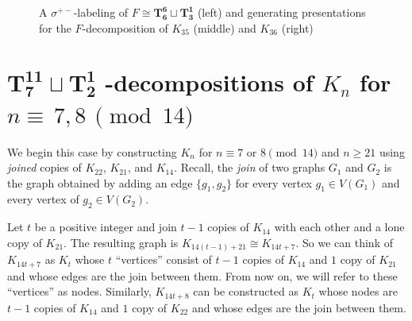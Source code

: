 \documentclass{dmgt}
\begin{document}
\begin{figure}[H]
    \caption{A $\sigma^{+-}$-labeling of $F \cong\mathbf{T_{6}^{6}} \sqcup \mathbf{T_{3}^{1}}$ (left) and generating presentations for the $F$-decomposition of $K_{35}$ (middle) and $K_{36}$ (right)}
    \label{tab:(1-2-3)example}
\end{figure}
\newpage
\section{$\mathbf{T_{7}^{11}}\sqcup\mathbf{T_{2}^{1}}$ -decompositions of $K_{n}$ for $n\equiv\,7,8\,\pmod{14}$} \label{sec:star}

We begin this case by constructing $K_{n}$ for $n \equiv 7 \textrm{ or } 8 \pmod{14}$ and $n\geq 21$ using \textit{joined} copies of $K_{22}$, $K_{21}$, and $K_{14}$. Recall, the \textit{join} of two graphs $G_{1}$ and $G_{2}$ is the graph obtained by adding an edge $\{g_1,g_2\}$ for every vertex $g_1 \in V(G_{1})$ and every vertex of $g_2 \in V(G_{2})$.

Let $t$ be a positive integer and join $t-1$ copies of $K_{14}$ with each other and a lone copy of $K_{21}$. The resulting graph is $K_{14(t-1)+21} \cong K_{14t+7}$. So we can think of $K_{14t+7}$ as $K_{t}$ whose $t$ ``vertices'' consist of $t-1$ copies of $K_{14}$ and $1$ copy of $K_{21}$ and whose edges are the join between them. From now on, we will refer to these ``vertices'' as nodes. Similarly, $K_{14t+8}$ can be constructed as $K_{t}$ whose nodes are $t-1$ copies of $K_{14}$ and $1$ copy of $K_{22}$ and whose edges are the join between them.
\end{document}
